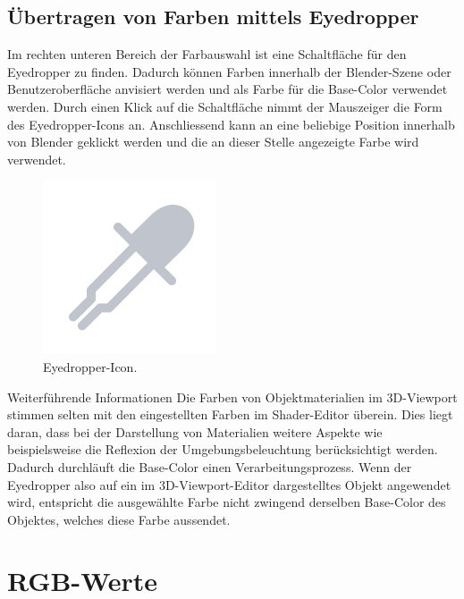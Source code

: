 \documentclass[
]{book}
\let\oldmarginnote\marginnote
\renewcommand{\marginnote}[1]{%
  \oldmarginnote{{\footnotesize\selectfont #1}}%
}
\begin{document}
\subsection{Übertragen von Farben mittels
Eyedropper}\label{uxfcbertragen-von-farben-mittels-eyedropper}

\marginnote{Eyedropper}

Im rechten unteren Bereich der Farbauswahl ist eine Schaltfläche für den
Eyedropper zu finden. Dadurch können Farben innerhalb der Blender-Szene
oder Benutzeroberfläche anvisiert werden und als Farbe für die
Base-Color verwendet werden. Durch einen Klick auf die Schaltfläche
nimmt der Mauszeiger die Form des Eyedropper-Icons an. Anschliessend
kann an eine beliebige Position innerhalb von Blender geklickt werden
und die an dieser Stelle angezeigte Farbe wird verwendet.

\begin{figure}

\includegraphics{Chapters/Images/Chapter_19/19_2_Icon_Eyedropper.png}

\caption{\label{fig-1_2}Eyedropper-Icon.}

\end{figure}%

\begin{tipp}{Weiterführende Informationen}
Die Farben von Objektmaterialien im 3D-Viewport stimmen selten mit den eingestellten Farben im Shader-Editor überein. Dies liegt daran, dass bei der Darstellung von Materialien weitere Aspekte wie beispielsweise die Reflexion der Umgebungsbeleuchtung berücksichtigt werden. Dadurch durchläuft die Base-Color einen Verarbeitungsprozess. Wenn der Eyedropper also auf ein im 3D-Viewport-Editor dargestelltes Objekt angewendet wird, entspricht die ausgewählte Farbe nicht zwingend derselben Base-Color des Objektes, welches diese Farbe aussendet.
\end{tipp}

\section{RGB-Werte}\label{rgb-werte}
\end{document}
